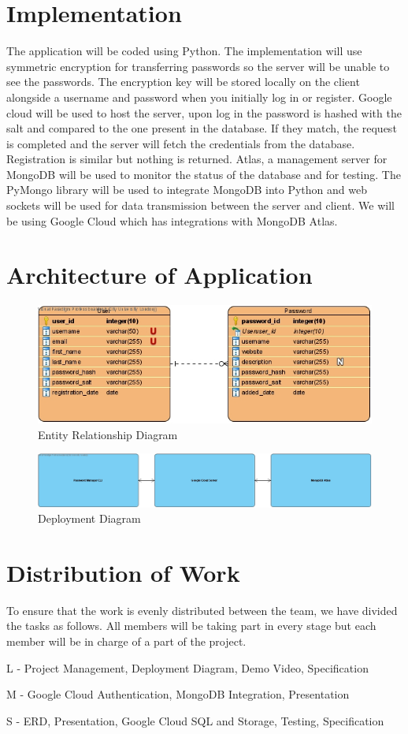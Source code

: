 \documentclass[11pt]{article}
\begin{document}
\section{Implementation}
The application will be coded using Python. The implementation will use symmetric encryption for transferring passwords so the server will be unable to see the passwords. The encryption key will be stored locally on the client alongside a username and password when you initially log in or register. Google cloud will be used to host the server, upon log in the password is hashed with the salt and compared to the one present in the database. If they match, the request is completed and the server will fetch the credentials from the database. Registration is similar but nothing is returned. Atlas, a management server for MongoDB will be used to monitor the status of the database and for testing. The PyMongo library will be used to integrate MongoDB into Python and web sockets will be used for data transmission between the server and client. We will be using Google Cloud which has integrations with MongoDB Atlas.
\section{Architecture of Application}
\begin{figure}
\centering
\includegraphics[width=1.0\textwidth]{diagrams/erd.jpg}
\caption{Entity Relationship Diagram}
\end{figure}
\begin{figure}
\centering
\includegraphics[width=1.0\textwidth]{diagrams/dd.jpg}
\caption{Deployment Diagram}
\end{figure}

\section{Distribution of Work}
To ensure that the work is evenly distributed between the team, we have divided the tasks as follows. All members will be taking part in every stage but each member will be in charge of a part of the project.
\par
L - Project Management, Deployment Diagram, Demo Video, Specification
\par
M - Google Cloud Authentication, MongoDB Integration, Presentation
\par
S - ERD, Presentation, Google Cloud SQL and Storage, Testing, Specification
\printbibliography[heading=bibintoc]
\end{document}
